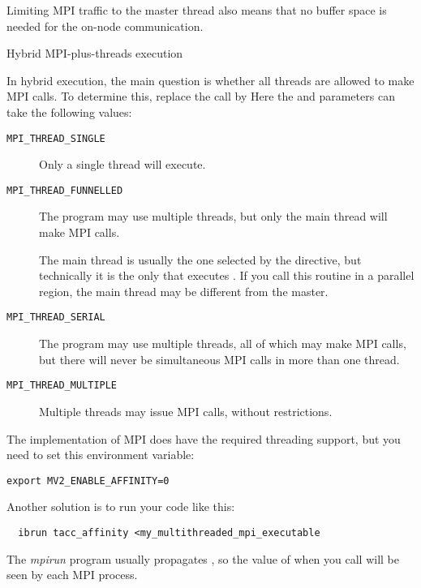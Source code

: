 Limiting MPI traffic to the master thread also means that no buffer
space is needed for the on-node communication.

 {Hybrid MPI-plus-threads execution}
\label{sec:init-thread}

In hybrid execution, the main question is whether all threads
are allowed to make MPI calls. To determine this,
replace the  call by
%
%
Here the  and  parameters can take the following
values:
\begin{description}
\item[\texttt{MPI\_THREAD\_SINGLE}] Only a
  single thread will execute.
\item[\texttt{MPI\_THREAD\_FUNNELLED}]
  The program may use multiple threads, but only the main thread will
  make MPI calls.

  The main thread is usually the one selected by the
   directive, but technically it is the only that
  executes . If you call this routine in
  a parallel region, the main thread may be different from the master.
\item[\texttt{MPI\_THREAD\_SERIAL}] The
  program may use multiple threads, all of which may make MPI calls,
  but there will never be simultaneous MPI calls in more than one
  thread.
\item[\texttt{MPI\_THREAD\_MULTIPLE}]
  Multiple threads may issue MPI calls, without restrictions.
\end{description}

\begin{tacc}
  The  implementation of MPI
  does have the required threading support, but you need to set this environment variable:  
\begin{verbatim}
export MV2_ENABLE_AFFINITY=0
\end{verbatim}
  Another solution is to run your code like this:
\begin{verbatim}
  ibrun tacc_affinity <my_multithreaded_mpi_executable
\end{verbatim}
\end{tacc}

The \emph{mpirun}
program usually propagates ,
so the value of  when you call 
will be seen by each MPI process.

